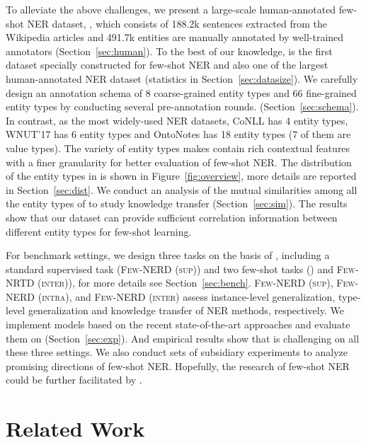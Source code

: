 \documentclass[11pt,a4paper, dvipsnames]{article}
\begin{document}
To alleviate the above challenges, we present a large-scale human-annotated few-shot NER dataset, , which consists of 188.2k sentences extracted from the Wikipedia articles and 491.7k entities are manually annotated by well-trained annotators (Section~\ref{sec:human}). To the best of our knowledge,  is the first dataset specially constructed for few-shot NER and also one of the largest human-annotated NER dataset (statistics in Section~\ref{sec:datasize}). We carefully design an annotation schema of 8 coarse-grained entity types and 66 fine-grained entity types by conducting several pre-annotation rounds. (Section~\ref{sec:schema}). In contrast, as the most widely-used NER datasets, CoNLL has 4 entity types, WNUT'17 has 6 entity types and OntoNotes has 18 entity types (7 of them are value types). The variety of entity types makes  contain rich contextual features with a finer granularity for better evaluation of few-shot NER. 
The distribution of the entity types in  is shown in Figure~\ref{fig:overview}, more details are reported in Section~\ref{sec:dist}. We conduct an analysis of the mutual similarities among all the entity types of  to study knowledge transfer (Section~\ref{sec:sim}). The results show that our dataset can provide sufficient correlation information between different entity types for few-shot learning.




For benchmark settings, we design three tasks on the basis of , including a standard supervised task (\textsc{Few-NERD  (sup)}) and two few-shot tasks () and \textsc{Few-NRTD (inter)}), for more details see Section~\ref{sec:bench}. \textsc{Few-NERD (sup)}, \textsc{Few-NERD (intra)}, and \textsc{Few-NERD (inter)} assess instance-level generalization, type-level generalization and knowledge transfer of NER methods, respectively. We implement models based on the recent state-of-the-art approaches and evaluate them on  (Section~\ref{sec:exp}). And empirical results show that  is challenging on all these three settings. We also conduct sets of subsidiary experiments to analyze promising directions of few-shot NER. Hopefully, the research of few-shot NER could be further facilitated by .

















\section{Related Work}
\end{document}
